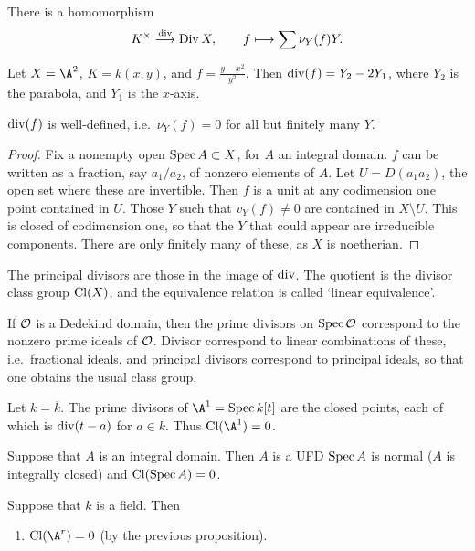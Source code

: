 \documentclass[11pt]{article}
\begin{document}
\begin{Nov10}
\begin{defn*}
There is a homomorphism
\[K^\times\overset{\textup{div}}{\longrightarrow}\operatorname{{Div}} X,\qquad f\longmapsto\sum \nu_Y(f)Y.\]
\end{defn*}
\begin{exmp*}
Let $X=\A^2$, $K=k(x,y)$, and $f=\frac{y-x^2}{y^2}$. Then $\textup{div}(f)=Y_2-2Y_1$, where $Y_2$ is the parabola, and $Y_1$ is the $x$-axis.
\end{exmp*}
\begin{lem*}
$\textup{div}(f)$ is well-defined, i.e.\ $\nu_Y(f)=0$ for all but finitely many $Y$.
\end{lem*}
\begin{proof}
Fix a nonempty open $\operatorname{Spec} A\subset X$, for $A$ an integral domain. $f$ can be written as a fraction, say $a_1/a_2$, of nonzero elements of $A$. Let $U=D(a_1a_2)$, the open set where these are invertible. Then $f$ is a unit at any codimension one point contained in $U$. Those $Y$ such that $v_Y(f)\neq0$ are contained in $X\setminus U$. This is closed of codimension one, so that the $Y$ that could appear are irreducible components. There are only finitely many of these, as $X$ is noetherian.
\end{proof}
\begin{defn*}
The principal divisors are those in the image of $\textup{div}$. The quotient is the divisor class group $\operatorname{{Cl}}(X)$, and the equivalence relation is called `linear equivalence'.
\end{defn*}
\begin{exmp*}
If $\mathcal{O}$ is a Dedekind domain, then the prime divisors on $\operatorname{Spec}\mathcal{O}$ correspond to the nonzero prime ideals of $\mathcal{O}$. Divisor correspond to linear combinations of these, i.e.\ fractional ideals, and principal divisors correspond to principal ideals, so that one obtains the usual class group.
\end{exmp*}
\begin{exmp*}
Let $k=\overline k$. The prime divisors of $\A^1=\spec k[t]$ are the closed points, each of which is $\textup{div}(t-a)$ for $a\in k$. Thus $\DivisorClass(\A^1)=0$.
\end{exmp*}
\begin{prop*}
Suppose that $A$ is an integral domain. Then $A$ is a UFD \Iff $\operatorname{Spec} A$ is normal ($A$ is integrally closed) and $\operatorname{{Cl}}(\operatorname{Spec} A)=0$.
\end{prop*}
\begin{prop*}
Suppose that $k$ is a field. Then
\begin{enumerate}\squishlist
\item $\DivisorClass(\A^r)=0$ (by the previous proposition).

\end{enumerate}
\end{prop*}
\end{Nov10}
\end{document}
